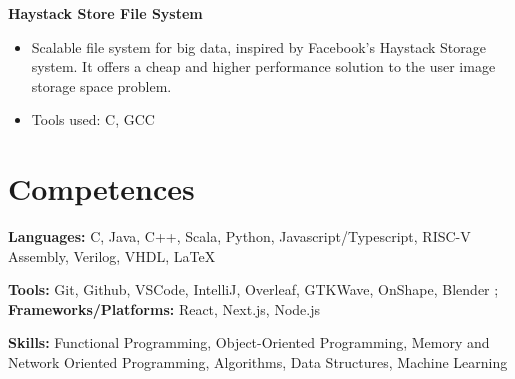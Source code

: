 \documentclass[a4paper, 10pt]{article}
\newenvironment{highlights}{
    \begin{itemize}[
        topsep=0.10 cm,
        parsep=0.10 cm,
        partopsep=0pt,
        itemsep=0pt,
        leftmargin=0.4 cm + 10pt
    ]
}{
    \end{itemize}
} %
\let\hrefWithoutArrow\href
\renewcommand{\href}[2]{\hrefWithoutArrow{#1}{\ifthenelse{\equal{#2}{}}{ }{#2 }\raisebox{.15ex}{\footnotesize \faExternalLink*}}}
\begin{document}
        \textbf{Haystack Store File System}\href{https://github.com/relogamimano/haystack-store}{}
        \begin{highlights}
            \item Scalable file system for big data, inspired by Facebook's Haystack Storage system. It offers a cheap and higher performance solution to the user image storage space problem.
            \item Tools used: C, GCC
        \end{highlights}





        
        
    
    \section{Competences}
    \textbf{Languages:} C, Java, C++, Scala, Python, Javascript/Typescript, RISC-V Assembly, Verilog, VHDL, LaTeX
    
    \vspace{0.2 cm}
    
    \textbf{Tools:} Git, Github, VSCode, IntelliJ, Overleaf, GTKWave, OnShape, Blender ; \textbf{Frameworks/Platforms:} React, Next.js, Node.js
    
    \vspace{0.2cm}
    
    \textbf{Skills:} Functional Programming, Object-Oriented Programming, Memory and Network Oriented Programming, Algorithms, Data Structures, Machine Learning
    
\end{document}

